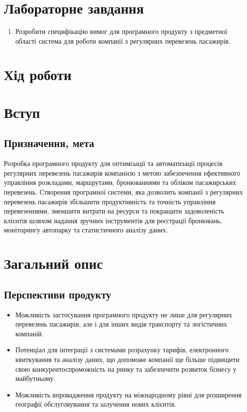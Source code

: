 \documentclass[14pt]{extreport}
\begin{document}
\begin{normalsize}
	\section*{Лабораторне завдання}
	\begin{enumerate}
		\item Розробити специфікацію вимог для програмного продукту з предметної області система для роботи компанії з регулярних перевезень пасажирів.
	\end{enumerate}
	
	\section*{Хід роботи}
	\section*{Вступ}
	\subsection*{Призначення, мета}
	Розробка програмного продукту для оптимізації та автоматизації процесів регулярних перевезень пасажирів компанією з метою забезпечення ефективного управління розкладами, маршрутами, бронюваннями та обліком пасажирських перевезень. Створення програмної системи, яка дозволить компанії з регулярних перевезень пасажирів збільшити продуктивність та точність управління перевезеннями, зменшити витрати на ресурси та покращити задоволеність клієнтів шляхом надання зручних інструментів для реєстрації бронювань, моніторингу автопарку та статистичного аналізу даних.
	
	\section*{Загальний опис}
	\subsection*{Перспективи продукту}
	\begin{itemize}
		\item Можливість застосування програмного продукту не лише для регулярних перевезень пасажирів, але і для інших видів транспорту та логістичних компаній.
		\item Потенціал для інтеграції з системами розрахунку тарифів, електронного квиткування та аналізу даних, що допоможе компанії ще більше підвищити свою конкурентоспроможність на ринку та забезпечити розвиток бізнесу у майбутньому.
		\item Можливість впровадження продукту на міжнародному рівні для розширення географії обслуговування та залучення нових клієнтів.
	\end{itemize}

\end{normalsize}
\end{document}
